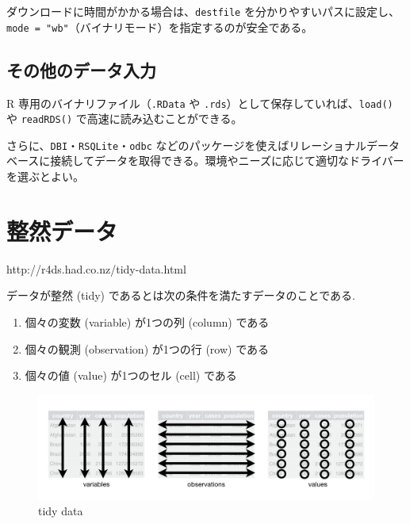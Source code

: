 \documentclass[
  letterpaper,
  xelatex,
  ja=standard, xelatex]{bxjsbook}
\providecommand{\tightlist}{%
  \setlength{\itemsep}{0pt}\setlength{\parskip}{0pt}}\usepackage{longtable,booktabs,array}
\begin{document}
ダウンロードに時間がかかる場合は、\texttt{destfile}
を分かりやすいパスに設定し、\texttt{mode\ =\ "wb"}（バイナリモード）を指定するのが安全である。

\section{その他のデータ入力}\label{ux305dux306eux4ed6ux306eux30c7ux30fcux30bfux5165ux529b}

R 専用のバイナリファイル（\texttt{.RData} や
\texttt{.rds}）として保存していれば、\texttt{load()} や
\texttt{readRDS()} で高速に読み込むことができる。

さらに、\texttt{DBI}・\texttt{RSQLite}・\texttt{odbc}
などのパッケージを使えばリレーショナルデータベースに接続してデータを取得できる。環境やニーズに応じて適切なドライバーを選ぶとよい。


\chapter{整然データ}\label{ux6574ux7136ux30c7ux30fcux30bf}

http://r4ds.had.co.nz/tidy-data.html

データが整然 (tidy) であるとは次の条件を満たすデータのことである.

\begin{enumerate}
\def\labelenumi{\arabic{enumi}.}
\tightlist
\item
  個々の変数 (variable) が1つの列 (column) である
\item
  個々の観測 (observation) が1つの行 (row) である
\item
  個々の値 (value) が1つのセル (cell) である
\end{enumerate}

\begin{figure}[H]

{\centering \includegraphics{index_files/mediabag/tidy-1.png}

}

\caption{tidy data}

\end{figure}%
\end{document}
